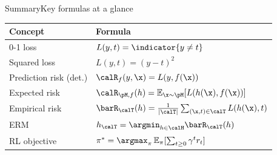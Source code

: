 \begin{frame}{Summary}{Key formulas at a glance}
  \begin{table}
    \centering
    \renewcommand{\arraystretch}{1.6}
    \begin{tabular}{ll}
      \toprule
      \textbf{Concept} & \textbf{Formula}\\
      \midrule
      0-1 loss          & $L(y,t) = \indicator{y \neq t}$ \\
      Squared loss      & $L(y,t) = (y-t)^2$ \\
      Prediction risk (det.) & $\calR_f(y,\x) = L(y, f(\x))$ \\
      Expected risk     & $\calR_{\pM,f}(h) = \mathbb{E}_{\x\sim\pM}[L(h(\x),f(\x))]$ \\
      Empirical risk    & $\barR_\calT(h) = \frac{1}{|\calT|}\sum_{(\x,t)\in\calT} L(h(\x),t)$ \\
      ERM               & $h_\calT = \argmin_{h\in\calH}\barR_\calT(h)$ \\
      RL objective      & $\pi^* = \argmax_\pi\,\mathbb{E}_\pi[\sum_{t\geq 0}\gamma^t r_t]$ \\
      \bottomrule
    \end{tabular}
  \end{table}
\end{frame}

%
